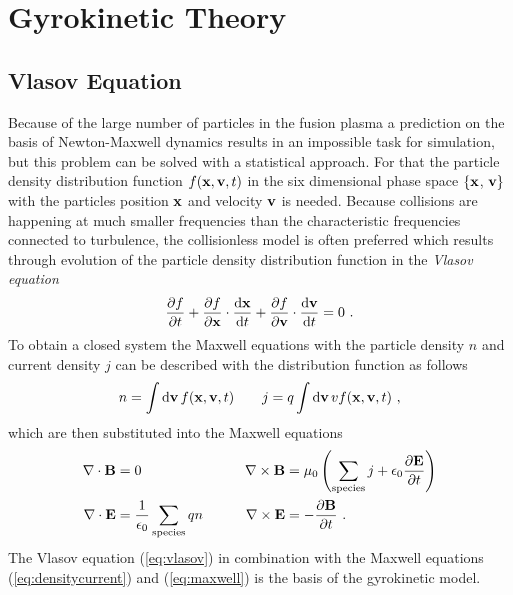 \newpage
\section{Gyrokinetic Theory}
\label{sec:gyrokinetic}

\subsection{Vlasov Equation}
\label{sub:vlasov}

Because of the large number of particles in the fusion plasma a prediction on the basis of Newton-Maxwell dynamics results in an impossible task for simulation, but this problem can be solved with a statistical approach. For that the particle density distribution function $f(\boldsymbol{\mathbf{x}}, \boldsymbol{\mathbf{v}}, t)$ in the six dimensional phase space $\{\boldsymbol{\mathbf{x}}$, $\boldsymbol{\mathbf{v}}\}$ with the particles position $\boldsymbol{\mathbf{x}}$ and velocity $\boldsymbol{\mathbf{v}}$ is needed. Because collisions are happening at much smaller frequencies than the characteristic frequencies connected to turbulence, the collisionless model is often preferred \cite{Garbet2010} which results through evolution of the particle density distribution function in the \textit{Vlasov equation}
\begin{gather}
	\frac{\partial f}{\partial t} + \frac{\partial f}{\partial \boldsymbol{\mathbf{x}}} \cdot \frac{\mathrm{d}\boldsymbol{\mathbf{x}}}{\mathrm{d}t} + \frac{\partial f}{\partial \boldsymbol{\mathbf{v}}} \cdot \frac{\mathrm{d}\boldsymbol{\mathbf{v}}}{\mathrm{d}t} = 0~.
	\label{eq:vlasov}
\end{gather}
To obtain a closed system the Maxwell equations with the particle density $n$ and current density $j$ can be described with the distribution function as follows
\begin{gather}
	n = \int \mathrm{d}\boldsymbol{\mathbf{v}}\,f(\boldsymbol{\mathbf{x}}, \boldsymbol{\mathbf{v}}, t) \qquad j = q \int \mathrm{d}\boldsymbol{\mathbf{v}}\, v f(\boldsymbol{\mathbf{x}}, \boldsymbol{\mathbf{v}}, t)~,
	\label{eq:densitycurrent}
\end{gather}
which are then substituted into the Maxwell equations
\begin{gather}
	\begin{aligned}
		\nabla \cdot \boldsymbol{\mathbf{B}} &= 0 &\qquad \nabla \times \boldsymbol{\mathbf{B}} &= \mu_0\left( \sum_\mathrm{species} j + \epsilon_0 \frac{\partial \boldsymbol{\mathbf{E}}}{\partial t} \right) \\
		\nabla \cdot \boldsymbol{\mathbf{E}} &= \frac{1}{\epsilon_0} \sum_\mathrm{species} qn &\qquad \nabla \times \boldsymbol{\mathbf{E}} &= - \frac{\partial \boldsymbol{\mathbf{B}}}{\partial t}~.
	\end{aligned}
	\label{eq:maxwell}
\end{gather}
The Vlasov equation (\ref{eq:vlasov}) in combination with the Maxwell equations (\ref{eq:densitycurrent}) and (\ref{eq:maxwell}) is the basis of the gyrokinetic model. \cite{Krommes2012}


